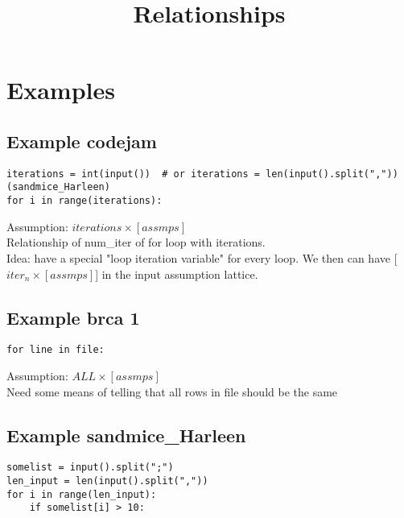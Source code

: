 \documentclass[11pt]{article}
\begin{document}
\title{Relationships}

\maketitle


\section{Examples}


\subsection{Example codejam}
\begin{lstlisting}
iterations = int(input())  # or iterations = len(input().split(",")) (sandmice_Harleen)
for i in range(iterations):  
\end{lstlisting}


Assumption: $iterations \times [assmps]$\\

Relationship of num\_iter of for loop with iterations. \\
Idea: have a special "loop iteration variable" for every loop. We then can have [$iter_n\times[assmps]$] in the input assumption lattice. \\



\subsection{Example brca 1}
\begin{lstlisting}
for line in file:
\end{lstlisting}


Assumption: $ALL \times [assmps]$\\

Need some means of telling that all rows in file should be the same\\


\subsection{Example sandmice\_Harleen}
\begin{lstlisting}
somelist = input().split(";")
len_input = len(input().split(","))
for i in range(len_input):
    if somelist[i] > 10:
\end{lstlisting}
\end{document}
